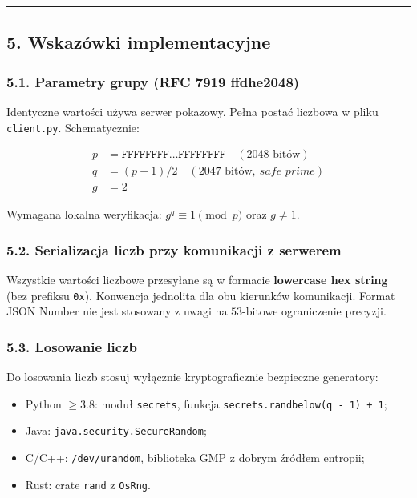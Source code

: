 \documentclass[
]{article}
\providecommand{\tightlist}{%
  \setlength{\itemsep}{0pt}\setlength{\parskip}{0pt}}
\let\oldrule\rule
\renewcommand{\rule}[2]{\noindent\oldrule{\linewidth}{0.4pt}}
\begin{document}
\begin{center}\rule{0.5\linewidth}{0.5pt}\end{center}

\subsection{5. Wskazówki
implementacyjne}\label{wskazuxf3wki-implementacyjne}

\subsubsection{5.1. Parametry grupy (RFC 7919
ffdhe2048)}\label{parametry-grupy-rfc-7919-ffdhe2048}

Identyczne wartości używa serwer pokazowy. Pełna postać liczbowa w pliku
\texttt{client.py}. Schematycznie:

\[
\begin{aligned}
p &= \mathtt{FFFFFFFF}\ldots\mathtt{FFFFFFFF} \quad (2048 \text{ bitów}) \\
q &= (p - 1)/2 \quad (2047 \text{ bitów},\ \textit{safe prime}) \\
g &= 2
\end{aligned}
\]

Wymagana lokalna weryfikacja: \(g^q \equiv 1 \pmod{p}\) oraz
\(g \neq 1\).

\subsubsection{5.2. Serializacja liczb przy komunikacji z
serwerem}\label{serializacja-liczb-przy-komunikacji-z-serwerem}

Wszystkie wartości liczbowe przesyłane są w formacie \textbf{lowercase
hex string} (bez prefiksu \texttt{0x}). Konwencja jednolita dla obu
kierunków komunikacji. Format JSON Number nie jest stosowany z uwagi na
\(53\)-bitowe ograniczenie precyzji.

\subsubsection{5.3. Losowanie liczb}\label{losowanie-liczb}

Do losowania liczb stosuj wyłącznie kryptograficznie bezpieczne
generatory:

\begin{itemize}
\tightlist
\item
  Python \(\geq 3.8\): moduł \texttt{secrets}, funkcja
  \texttt{secrets.randbelow(q\ -\ 1)\ +\ 1};
\item
  Java: \texttt{java.security.SecureRandom};
\item
  C/C++: \texttt{/dev/urandom}, biblioteka GMP z dobrym źródłem
  entropii;
\item
  Rust: crate \texttt{rand} z \texttt{OsRng}.
\end{itemize}
\end{document}
